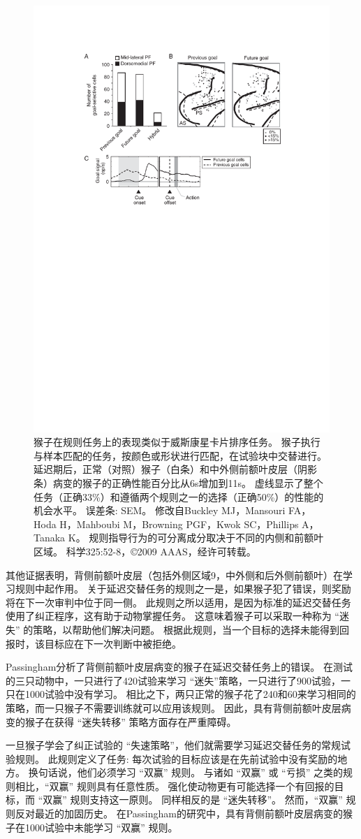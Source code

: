 \begin{figure}
	\centering
	\includegraphics[width=0.5\linewidth]{chap6/6_7}
	\caption{猴子在规则任务上的表现类似于威斯康星卡片排序任务。
		猴子执行与样本匹配的任务，按颜色或形状进行匹配，在试验块中交替进行。
		延迟期后，正常（对照）猴子（白条）和中外侧前额叶皮层（阴影条）病变的猴子的正确性能百分比从6s增加到11s。
		虚线显示了整个任务（正确33\%）和遵循两个规则之一的选择（正确50\%）的性能的机会水平。
		误差条: SEM。
		修改自Buckley MJ，Mansouri FA，Hoda H，Mahboubi M，Browning PGF，Kwok SC，Phillips A，Tanaka K。
		规则指导行为的可分离成分取决于不同的内侧和前额叶区域。
		科学325:52-8，©2009 AAAS，经许可转载。}
	\label{fig:6_6}
\end{figure}


其他证据表明，背侧前额叶皮层（包括外侧区域9，中外侧和后外侧前额叶）在学习规则中起作用。
关于延迟交替任务的规则之一是，如果猴子犯了错误，则奖励将在下一次审判中位于同一侧。
此规则之所以适用，是因为标准的延迟交替任务使用了纠正程序，这有助于动物掌握任务。
这意味着猴子可以采取一种称为 “迷失” 的策略，以帮助他们解决问题。
根据此规则，当一个目标的选择未能得到回报时，该目标应在下一次判断中被拒绝。


Passingham\cite{passingham1975delayed}分析了背侧前额叶皮层病变的猴子在延迟交替任务上的错误。
在测试的三只动物中，一只进行了420试验来学习 “迷失”策略，一只进行了900试验，一只在1000试验中没有学习。
相比之下，两只正常的猴子花了240和60来学习相同的策略，而一只猴子不需要训练就可以应用该规则。
因此，具有背侧前额叶皮层病变的猴子在获得 “迷失转移” 策略方面存在严重障碍。


一旦猴子学会了纠正试验的 “失速策略”，他们就需要学习延迟交替任务的常规试验规则。
此规则定义了任务: 每次试验的目标应该是在先前试验中没有奖励的地方。
换句话说，他们必须学习 “双赢” 规则。
与诸如 “双赢” 或 “亏损” 之类的规则相比，“双赢” 规则具有任意性质。
强化使动物更有可能选择一个有回报的目标，而 “双赢” 规则支持这一原则。
同样相反的是 “迷失转移”。
然而，“双赢” 规则反对最近的加固历史。
在Passingham\cite{passingham1975delayed}的研究中，具有背侧前额叶皮层病变的猴子在1000试验中未能学习 “双赢” 规则。


